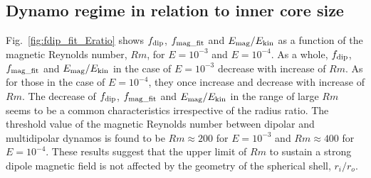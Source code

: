 \subsection{Dynamo regime in relation to inner core size}
\label{subsec:dynamo_regime}
{\color{red}
Fig.~\ref{fig:fdip_fit_Eratio} shows $f_{\rm dip}$, $f_{\rm mag\_fit}$ and $E_{\rm mag} / E_{\rm kin}$ as a function of the magnetic Reynolds number, $Rm$, for $E = 10^{-3}$ and $E = 10^{-4}$.
As a whole, $f_{\rm dip}$, $f_{\rm mag\_fit}$ and $E_{\rm mag} / E_{\rm kin}$ in the case of $E = 10^{-3}$ decrease with increase of $Rm$.
As for those in the case of $E = 10^{-4}$, they once increase and decrease with increase of $Rm$.
The decrease of $f_{\rm dip}$, $f_{\rm mag\_fit}$ and $E_{\rm mag} / E_{\rm kin}$ in the range of large $Rm$ seems to be a common characteristics irrespective of the radius ratio.
The threshold value of the magnetic Reynolds number between dipolar and multidipolar dynamos is found to be $Rm \approx 200$ for $E = 10^{-3}$ and $Rm \approx 400$ for $E = 10^{-4}$.
These results suggest that the upper limit of $Rm$ to sustain a strong dipole magnetic field is not affected by the geometry of the spherical shell, $r_i / r_o$.
}




